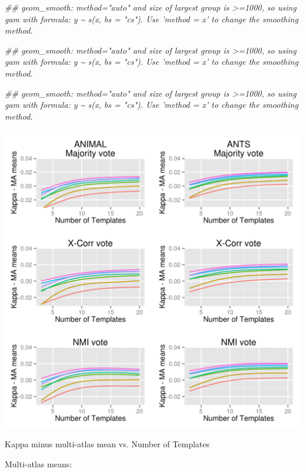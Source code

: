 \documentclass{article}\usepackage{graphicx, color}
\makeatletter
\def\maxwidth{ %
  \ifdim\Gin@nat@width>\linewidth
    \linewidth
  \else
    \Gin@nat@width
  \fi
}
\newenvironment{kframe}{%
 \def\at@end@of@kframe{}%
 \ifinner\ifhmode%
  \def\at@end@of@kframe{\end{minipage}}%
  \begin{minipage}{\columnwidth}%
 \fi\fi%
 \def\FrameCommand##1{\hskip\@totalleftmargin \hskip-\fboxsep
 \colorbox{shadecolor}{##1}\hskip-\fboxsep
     \hskip-\linewidth \hskip-\@totalleftmargin \hskip\columnwidth}%
 \MakeFramed {\advance\hsize-\width
   \@totalleftmargin\z@ \linewidth\hsize
   \@setminipage}}%
 {\par\unskip\endMakeFramed%
 \at@end@of@kframe}
\newenvironment{knitrout}{}{} %
\makeatother
\begin{document}
\begin{knitrout}
\begin{kframe}
{\ttfamily\noindent\itshape\textcolor{messagecolor}{\#\# geom\_smooth: method="auto" and size of largest group is >=1000, so using gam with formula: y \textasciitilde{} s(x, bs = "cs"). Use 'method = x' to change the smoothing method.}}

{\ttfamily\noindent\itshape\textcolor{messagecolor}{\#\# geom\_smooth: method="auto" and size of largest group is >=1000, so using gam with formula: y \textasciitilde{} s(x, bs = "cs"). Use 'method = x' to change the smoothing method.}}

{\ttfamily\noindent\itshape\textcolor{messagecolor}{\#\# geom\_smooth: method="auto" and size of largest group is >=1000, so using gam with formula: y \textasciitilde{} s(x, bs = "cs"). Use 'method = x' to change the smoothing method.}}\end{kframe}\includegraphics[width=\maxwidth]{figure/a2a} 
\end{knitrout}


Kappa minus multi-atlas mean vs. Number of Templates

Multi-atlas means:
\end{document}
